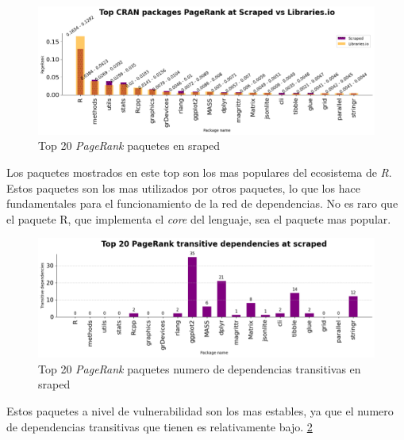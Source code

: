 \begin{figure}[ht!]
    \begin{center}
        \includegraphics[width=1\textwidth]{img/cran/pr_inverted.png}
        \caption{Top 20 \textit{PageRank} paquetes en sraped}
        \label{fig:Top 20 PageRank paquetes en sraped}
    \end{center}
\end{figure}

Los paquetes mostrados en este top son los mas populares del ecosistema de \textit{R}.
Estos paquetes son los mas utilizados por otros paquetes, lo que los hace fundamentales para el
funcionamiento de la red de dependencias. No es raro que el paquete R, que implementa el \textit{core}
del lenguaje, sea el paquete mas popular.

\begin{figure}[ht!]
    \begin{center}
        \includegraphics[width=1\textwidth]{img/cran/transitive_pr_scr.png}
        \caption{Top 20 \textit{PageRank} paquetes numero de dependencias transitivas en sraped}
        \label{fig:Top 20 PageRank paquetes numero de dependencias transitivas en sraped}
    \end{center}
\end{figure}

Estos paquetes a nivel de vulnerabilidad son los mas estables, ya que el numero de dependencias
transitivas que tienen es relativamente bajo. \ref{fig:Top 20 PageRank paquetes numero de dependencias transitivas en sraped}

